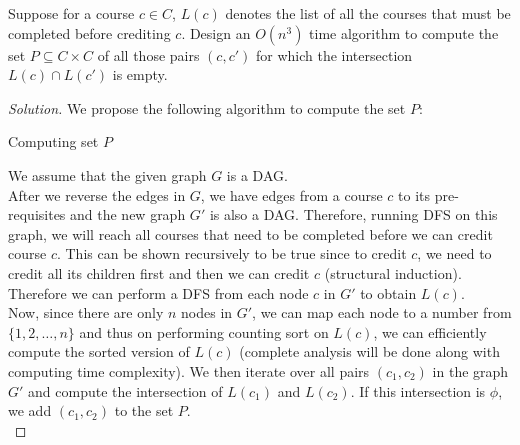 \begin{solution}{2.3}
    \begin{question}
        Suppose for a course $c\in C$, $L(c)$ denotes the list of all the courses that must be completed before crediting $c$. Design an $O(n^3)$ time algorithm to compute the set $P \subseteq C \times C$ of all those pairs $(c, c')$ for which the intersection $L(c) \cap L(c')$ is empty. 
    \end{question}
    \tcblower{}
    \begin{proof}[Solution]
        We propose the following algorithm to compute the set $P$:
        \begin{algorithm}[H]
            \caption{Computing set $P$}\label{alg:P}
            \begin{algorithmic}[1]
                     
                          
                          
                    \EndFor{}
                        \EndIf{}
                    \EndFor{}
                \EndProcedure{}
            \end{algorithmic}
        \end{algorithm}
        We assume that the given graph $G$ is a DAG.\\
        After we reverse the edges in $G$, we have edges from a course $c$ to its pre-requisites and the new graph $G'$ is also a DAG\@. Therefore, running DFS on this graph, we will reach all courses that need to be completed before we can credit course $c$. This can be shown recursively to be true since to credit $c$, we need to credit all its children first and then we can credit $c$ (structural induction). Therefore we can perform a DFS from each node $c$ in $G'$ to obtain $L(c)$.\\
        Now, since there are only $n$ nodes in $G'$, we can map each node to a number from $\{1, 2, \ldots, n\}$ and thus on performing counting sort on $L(c)$, we can efficiently compute the sorted version of $L(c)$ (complete analysis will be done along with computing time complexity). We then iterate over all pairs $(c_1, c_2)$ in the graph $G'$ and compute the intersection of $L(c_1)$ and $L(c_2)$. If this intersection is $\phi$, we add $(c_1, c_2)$ to the set $P$.\\


\end{proof}
\end{solution}
